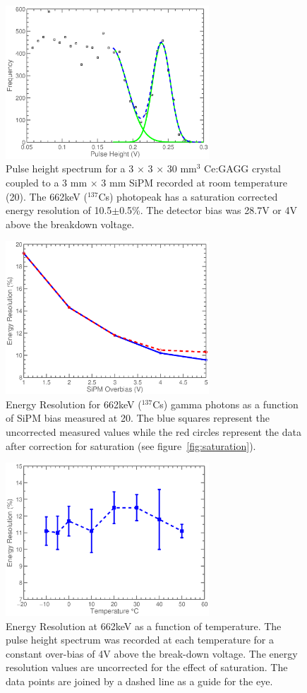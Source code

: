\documentclass[journal]{IEEEtran}
\begin{document}
\begin{figure}[t]
\centering
\includegraphics[width=3in]{energy_resolution.eps}
\caption{Pulse height spectrum for a 3 $\times$ 3 $\times$ 30 mm$^{3}$ Ce:GAGG crystal coupled to a 3 mm $\times$ 3 mm SiPM recorded at room temperature (20\celsius{}). The 662keV ($^{137}$Cs) photopeak has a saturation corrected energy resolution of 10.5$\pm$0.5\%. The detector bias was 28.7V or 4V above the breakdown voltage.}
\label{fig:er}
\end{figure}

\begin{figure}[tb]
\centering
\includegraphics[width=3in]{er_obias.eps}
\caption{Energy Resolution for 662keV ($^{\text{137}}$Cs) gamma photons as a function of SiPM bias measured at 20\celsius{}. The blue squares represent the uncorrected measured values while the red circles represent the data after correction for saturation (see figure~\ref{fig:saturation}).}
\label{fig:erbias}
\end{figure}

\begin{figure}[tb]
\centering
\includegraphics[width=3in]{temp_er.eps}
\caption{Energy Resolution at 662keV as a function of temperature. The pulse height spectrum was recorded at each temperature for a constant over-bias of 4V above the break-down voltage. The energy resolution values are uncorrected for the effect of saturation. The data points are joined by a dashed line as a guide for the eye.}
\label{fig:ertemp}
\end{figure}
\end{document}
